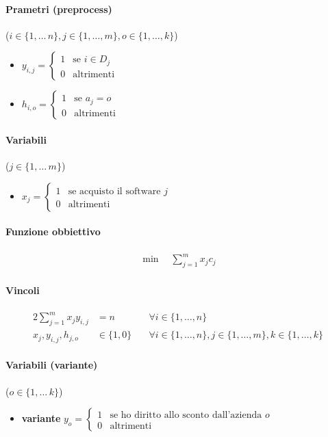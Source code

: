 \documentclass{article}
\begin{document}
\paragraph{Prametri (preprocess)} ($i \in \{1,\ldots\,n\}, j \in \{1,\ldots,m\}, o \in \{1,\ldots,k\}$)
\begin{itemize}
  \item $y_{i,j} = \begin{cases}
      1 & \text{se }i \in D_j \\
      0 & \text{altrimenti}
  \end{cases}$
  \item $h_{i,o} = \begin{cases}
      1 & \text{se }a_j = o \\
      0 & \text{altrimenti}
  \end{cases}$
\end{itemize}

\paragraph{Variabili} ($j \in \{1,\ldots\,m\}$)
\begin{itemize}
  \item $x_j = \begin{cases}
      1 & \text{se acquisto il software }j\\
      0 & \text{altrimenti}
  \end{cases}$
\end{itemize}

\paragraph{Funzione obbiettivo}
\begin{align*}
  \min \quad \sum_{j=1}^m x_j c_j
\end{align*}

\paragraph{Vincoli}
\begin{alignat}{2}
  \sum_{j=1}^m x_j y_{i,j} &= n &\forall i \in \{1,\ldots,n\}\\
  x_j, y_{i,j}, h_{j,o} &\in \{1,0\} \quad &\forall i \in \{1,\ldots,n\}, j \in \{1,\ldots,m\}, k \in \{1,\ldots,k\}
\end{alignat}

\paragraph{Variabili (variante)} ($o \in \{1,\ldots\,k\}$)
\begin{itemize}
  \item \textbf{variante} $y_o = \begin{cases}
      1 & \text{se ho diritto allo sconto dall'azienda }o \\
      0 & \text{altrimenti}
  \end{cases}$
\end{itemize}
\end{document}
